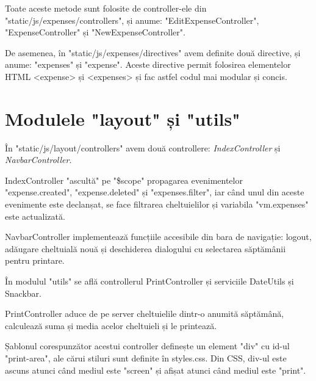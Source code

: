

Toate aceste metode sunt folosite de controller-ele din
"static/js/expenses/controllers", și anume: "EditExpenseController",
"ExpenseController" și "NewExpenseController".

De asemenea, în "static/js/expenses/directives" avem definite două
directive, și anume: "expenses" și "expense".
Aceste directive permit folosirea elementelor HTML <expense>
și <expenses> și fac astfel codul mai modular și concis.







\section{Modulele "layout" și "utils"}

În "static/js/layout/controllers" avem două controllere:
\emph{IndexController} și \emph{NavbarController}.

IndexController "ascultă"
pe "\$scope" propagarea evenimentelor "expense.created", "expense.deleted"
și "expenses.filter", iar când unul din aceste evenimente este
declanșat, se face filtrarea cheltuielilor și variabila
"vm.expenses" este actualizată.



NavbarController implementează funcțiile accesibile
din bara de navigație: logout, adăugare cheltuială nouă
și deschiderea dialogului cu selectarea săptămânii
pentru printare.

În modulul "utils" se află controllerul PrintController
și serviciile DateUtils și Snackbar.

PrintController aduce de pe server cheltuielile
dintr-o anumită săptămână, calculează suma
și media acelor cheltuieli și le printează.

Șablonul corespunzător acestui controller
definește un element "div" cu id-ul "print-area",
ale cărui stiluri sunt definite în styles.css.
Din CSS, div-ul este ascuns atunci când mediul
este "screen" și afișat atunci când mediul
este "print".

